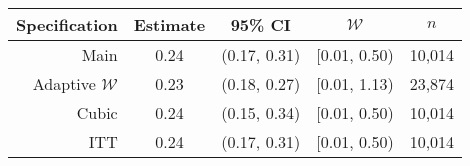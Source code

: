 \begin{tabular}{rcccc}
  \hline
Specification & Estimate & 95\% CI & $\mathcal{W}$ & $n$ \\
  \hline
Main & 0.24 & (0.17, 0.31) & [0.01, 0.50) & 10,014 \\
  Adaptive $\mathcal{W}$ & 0.23 & (0.18, 0.27) & [0.01, 1.13) & 23,874 \\
  Cubic & 0.24 & (0.15, 0.34) & [0.01, 0.50) & 10,014 \\
  ITT & 0.24 & (0.17, 0.31) & [0.01, 0.50) & 10,014 \\
   \hline
\end{tabular}
